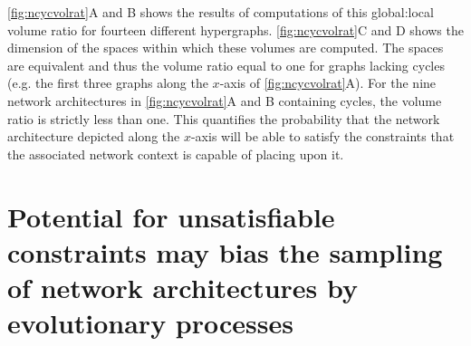 \autoref{fig:ncycvolrat}A and B shows the results of computations of this global:local volume ratio for fourteen different hypergraphs. \autoref{fig:ncycvolrat}C and D shows the dimension of the spaces within which these volumes are computed. The spaces are equivalent and thus the volume ratio equal to one for graphs lacking cycles (e.g. the first three graphs along the $x$-axis of \autoref{fig:ncycvolrat}A). For the nine network architectures in \autoref{fig:ncycvolrat}A and B containing cycles, the volume ratio is strictly less than one. This quantifies the probability that the network architecture depicted along the $x$-axis will be able to satisfy the constraints that the associated network context is capable of placing upon it.

\section{Potential for unsatisfiable constraints may bias the sampling of network architectures by evolutionary processes}\label{sec:unsatisfiableconstrevolution}


